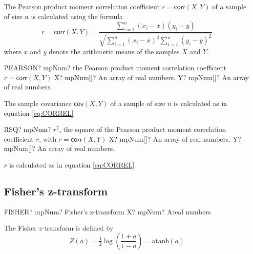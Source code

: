 \vspace{0.3cm}
The Pearson product moment correlation coefficient  $r = \textsf{corr}(X,Y)$ of a sample of size $n$ is calculated using the formula
\begin{equation} \label{eq:CORREL}
	r = \textsf{corr}(X,Y) = \frac{\sum_{i=1}^n (x_i-\overline{x})(y_i-\overline{y})}{\sqrt{\sum_{i=1}^n (x_i-\overline{x})^2\sum_{i=1}^n (y_i-\overline{y})^2}}
\end{equation}
where $\overline{x}$ and $\overline{y}$ denote the arithmetic means of the samples $X$ and $Y$.

\vspace{0.6cm}
\begin{mpFunctionsExtract}
	\mpWorksheetFunctionTwoNotImplemented
	{PEARSON? mpNum? the Pearson product moment correlation coefficient  $r = \textsf{corr}(X,Y)$}
	{X? mpNum[]? An array of real numbers.}
	{Y? mpNum[]? An array of real numbers.}
\end{mpFunctionsExtract}

\vspace{0.3cm}
The sample covariance $\textsf{cov}(X,Y)$ of a sample of size $n$ is calculated as in equation \ref{eq:CORREL}



\vspace{0.6cm}
\begin{mpFunctionsExtract}
	\mpWorksheetFunctionTwoNotImplemented
	{RSQ? mpNum? $r^2$, the square of the Pearson product moment correlation coefficient $r$, with $r = \textsf{corr}(X,Y)$}
	{X? mpNum[]? An array of real numbers.}
	{Y? mpNum[]? An array of real numbers.}
\end{mpFunctionsExtract}

\vspace{0.3cm}
$r$ is calculated as in equation \ref{eq:CORREL}




\subsection{Fisher's z-transform}
\begin{mpFunctionsExtract}
	\mpWorksheetFunctionOneNotImplemented
	{FISHER? mpNum? Fisher's z-transform}
	{X? mpNum? Areal numbers}
\end{mpFunctionsExtract}

\vspace{0.3cm}
The Fisher $z$-transform is defined by
\begin{equation}  
	Z(a)=\tfrac{1}{2} \log \left(\frac{1+a}{1-a}\right) = \text{atanh}(a)
\end{equation}


